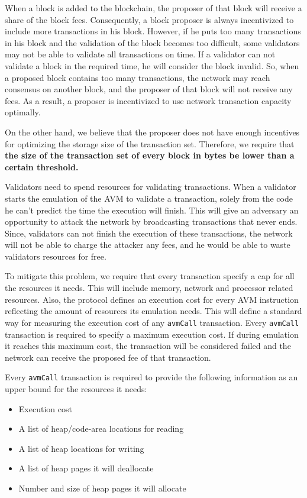 \documentclass[11pt, a4paper]{report}
\begin{document}
    When a block is added to the blockchain, the proposer of that block will receive a share of the block fees.
    Consequently, a block proposer is always incentivized to include more transactions in his block. However, if he
    puts too many transactions in his block and the validation of the block becomes too difficult, some validators
    may not be able to validate all transactions on time. If a validator can not validate a block in the required
    time, he will consider the block invalid. So, when a proposed block contains too many transactions, the network
    may reach consensus on another block, and the proposer of that block will not receive any fees. As a result, a
    proposer is incentivized to use network transaction capacity optimally.

    On the other hand, we believe that the proposer does not have enough incentives for optimizing the storage size
    of the transaction set. Therefore, we require that \textbf{the size of the transaction set of every block in
    bytes be lower than a certain threshold.}

    Validators need to spend resources for validating transactions. When a validator starts the emulation of the AVM
    to validate a transaction, solely from the code he can't predict the time the execution will finish. This will
    give an adversary an opportunity to attack the network by broadcasting transactions that never ends. Since,
    validators can not finish the execution of these transactions, the network will not be able to charge the
    attacker any fees, and he would be able to waste validators resources for free.

    To mitigate this problem, we require that every transaction specify a cap for all the resources it needs. This
    will include memory, network and processor related resources. Also, the protocol defines an execution cost for
    every AVM instruction reflecting the amount of resources its emulation needs. This will define a standard way for
    measuring the execution cost of any \texttt{avmCall} transaction. Every \texttt{avmCall} transaction is required
    to specify a maximum execution cost. If during emulation it reaches this maximum cost, the transaction will be
    considered failed and the network can receive the proposed fee of that transaction.

    Every \texttt{avmCall} transaction is required to provide the following information as an upper bound for the
    resources it needs:

    \begin{itemize}
        \item Execution cost
        \item A list of heap/code-area locations for reading
        \item A list of heap locations for writing
        \item A list of heap pages it will deallocate
        \item Number and size of heap pages it will allocate
    \end{itemize}
\end{document}
